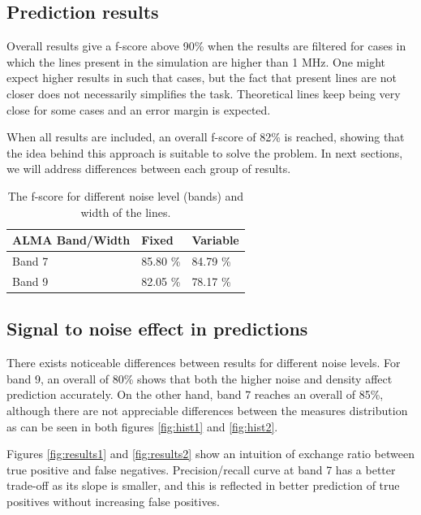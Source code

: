 \subsection{Prediction results}
Overall results give a f-score above 90\% when the results are filtered for cases in which the lines present in the simulation are higher than 1 MHz.
One might expect higher results in such that cases, but the fact that present lines are not closer does not necessarily simplifies the task.
Theoretical lines keep being very close for some cases and an error margin is expected.

When all results are included, an overall f-score of 82\% is reached, showing that the idea behind this approach is suitable to solve the problem.
In next sections, we will address differences between each group of results.

\begin{center}
	\begin{table}
		\begin{tabular}{ | l | l | l | }
			\hline
			{\bf ALMA Band/Width } & {\bf Fixed } & {\bf Variable} \\ \hline
			Band 7 & 85.80 \% & 84.79 \% \\ \hline
			Band 9 & 82.05 \% & 78.17 \% \\ 
			\hline
		\end{tabular}
		\caption{ The f-score for different noise level (bands) and width of the lines.}
		\label{tab:results}
	\end{table}
\end{center}

\subsection{Signal to noise effect in predictions}
There exists noticeable differences between results for different noise levels.
For band 9, an overall of 80\% shows that both the higher noise and density affect prediction accurately.
On the other hand, band 7 reaches an overall of 85\%, although there are not appreciable differences between the measures distribution as can be seen in both figures \ref{fig:hist1} and \ref{fig:hist2}.

Figures \ref{fig:results1} and \ref{fig:results2} show an intuition of exchange ratio between true positive and false negatives.
Precision/recall curve at band 7 has a better trade-off as its slope is smaller,  and this is reflected in better prediction of true positives without increasing false positives.

